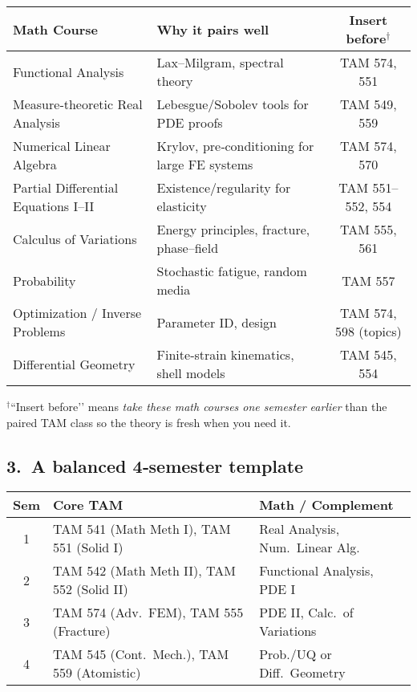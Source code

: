 \documentclass[12pt]{article}
\theoremstyle{definition} %
\theoremstyle{plain} %
\begin{document}
\vspace{-1em}
\begin{center}
\begin{tabular}{@{}llc@{}}
\toprule
\textbf{Math Course} & \textbf{Why it pairs well} & \textbf{Insert before$^\dagger$} \\ 
\midrule
Functional Analysis & Lax–Milgram, spectral theory                          & TAM 574, 551 \\
Measure‑theoretic Real Analysis & Lebesgue/Sobolev tools for PDE proofs      & TAM 549, 559 \\
Numerical Linear Algebra & Krylov, pre‑conditioning for large FE systems     & TAM 574, 570 \\
Partial Differential Equations I–II & Existence/regularity for elasticity    & TAM 551–552, 554 \\
Calculus of Variations & Energy principles, fracture, phase–field           & TAM 555, 561 \\
Probability & Stochastic fatigue, random media                               & TAM 557 \\
Optimization / Inverse Problems & Parameter ID, design                      & TAM 574, 598 (topics) \\
Differential Geometry & Finite‑strain kinematics, shell models               & TAM 545, 554 \\
\bottomrule
\end{tabular}
\end{center}

\begingroup\footnotesize
\noindent
$^\dagger$“Insert before’’ means \emph{take these math courses one
semester earlier} than the paired TAM class so the theory is fresh when
you need it.
\endgroup

\subsection*{3.\  A balanced 4‑semester template}

\begin{center}
\begin{tabular}{@{}cll@{}}
\toprule
\textbf{Sem} & \textbf{Core TAM} & \textbf{Math / Complement} \\
\midrule
1 & TAM 541 (Math Meth I), TAM 551 (Solid I)    & Real Analysis, Num.\ Linear Alg. \\
2 & TAM 542 (Math Meth II), TAM 552 (Solid II)  & Functional Analysis, PDE I \\
3 & TAM 574 (Adv.\ FEM), TAM 555 (Fracture)     & PDE II, Calc.\ of Variations \\
4 & TAM 545 (Cont.\ Mech.), TAM 559 (Atomistic) & Prob./UQ or Diff.\ Geometry \\
\bottomrule
\end{tabular}
\end{center}
\end{document}
